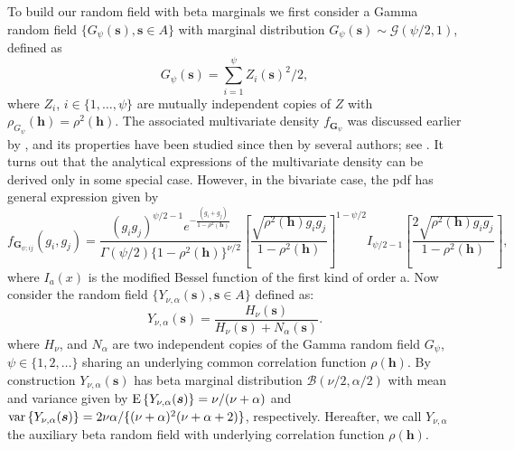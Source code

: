 \documentclass[times,sort&compress,3p]{elsarticle}
\theoremstyle{plain}%
\theoremstyle{definition}
\def\GG{\bm{G}}
\def\ss{\bm{s}}
\def\EE{{\rm E}}
\def\VV{{\rm var}}
\def\hh{\bm{h}}
\def\bh{\bm{h}}
\begin{document}
To build our random field with beta marginals we  first consider a Gamma random field $\{G_{\psi}(\ss), \ss \in A\}$ with marginal distribution $G_{\psi}(\ss) \sim  \mathcal{G} (\psi/2,1)$, defined as
\begin{equation*}\label{pairchi}
G_{\psi}(\ss)=\sum_{i=1}^\psi Z_i(\ss)^2/2,
\end{equation*}
where $Z_i$, $i\in\{1,\ldots,\psi\}$  are mutually independent copies of $Z$ with  $\rho_{G_{\psi}}(\hh) =
\rho^2(\hh)$. The associated multivariate density $f_{\GG_{\psi}}$ was discussed earlier by \citet{krishnamoorthy1951}, and its properties have been studied since then by several authors; see \citep{Kri:rao:1961,Royen:2004}. It turns out that the analytical expressions of the multivariate density can be derived only in some special case. However, in the bivariate case, the pdf has general expression given by \citep{kibble1941two}
\begin{equation}\label{pairchi2}
f_{\GG_{\psi;ij}}(g_{i},g_j)=\frac{(g_ig_j)^{\psi/2-1}e^{-\frac{(g_i+g_j)}{1-\rho^2(\bh)}}}{\Gamma\left(\psi/2\right)\{1-\rho^2(\bh)\}^{\nu/2}}
\left[\frac{\sqrt{\rho^2(\bh)g_ig_j}}{1-\rho^2(\bh)}\right]^{1-\psi/2}I_{\psi/2-1}
\left[ \frac{ 2\sqrt{\rho^2(\bh)g_ig_j} } {1-\rho^2(\bh)}\right],
\end{equation}
where  $I_{a}(x)$  is the modified Bessel function of the first kind of order a.
Now consider the random field $\{Y_{\nu,\alpha}(\ss), \ss \in A\}$  defined as:
\begin{equation}\label{repbetgen}
Y_{\nu,\alpha}(\ss)=\dfrac{H_{\nu}(\ss)}{H_{\nu}(\ss)+N_{\alpha}(\ss)}.
\end{equation}
where $H_{\nu}$, and $N_{\alpha}$ are two independent copies of the Gamma random field $G_{\psi}$, $\psi \in \{ 1,2,\ldots \}$ sharing an underlying common correlation function $\rho(\bh)$.
By construction
$Y_{\nu,\alpha}(\ss)$ has  beta marginal distribution $\mathcal{B}(\nu/2,\alpha/2)$
with mean and variance given by $\EE\left\{Y_{\nu,\alpha}(\ss)\right\}=\nu/(\nu+\alpha)$ and $\VV\left\{Y_{\nu,\alpha}(\ss)\right\}=2\nu \alpha/\{(\nu+\alpha)^2(\nu+\alpha+2)\}$, respectively. Hereafter, we call $Y_{\nu,\alpha}$ the auxiliary beta random field with underlying correlation function $\rho(\hh)$.
\end{document}
